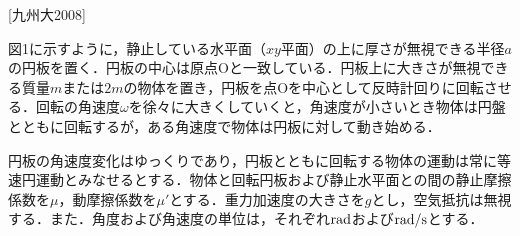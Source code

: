 

\noindent
{} [九州大2008]

図1に示すように，静止している水平面（$xy$平面）の上に厚さが無視できる半径$a$の円板を置く．円板の中心は原点Oと一致している．円板上に大きさが無視できる質量$m$または$2m$の物体を置き，円板を点Oを中心として反時計回りに回転させる．回転の角速度$\omega$を徐々に大きくしていくと，角速度が小さいとき物体は円盤とともに回転するが，ある角速度で物体は円板に対して動き始める．

円板の角速度変化はゆっくりであり，円板とともに回転する物体の運動は常に等速円運動とみなせるとする．物体と回転円板および静止水平面との間の静止摩擦係数を$\mu$，動摩擦係数を$\mu'$とする．重力加速度の大きさを$g$とし，空気抵抗は無視する．また．角度および角速度の単位は，それぞれ$\mathrm{rad}$および$\mathrm{rad/s}$とする．


